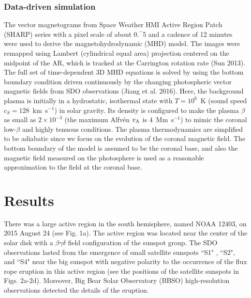 \documentclass[12pt,preprint]{aastex}
\begin{document}
\begin{CJK*}{UTF8}{gbsn}
\subsubsection{Data-driven simulation} 
The vector magnetograms from Space Weather HMI Active Region Patch (SHARP) series with a pixel scale of about 0.$^\prime$$^\prime$5 and a cadence of 12 minutes were used to derive the magnetohydrodynamic (MHD) model. The images were remapped using Lambert (cylindrical equal area) projection centered on the midpoint of the AR, which is tracked at the Carrington rotation rate (Sun 2013). The full set of time-dependent 3D MHD equations is solved by using the bottom boundary condition driven continuously by the changing photospheric vector magnetic fields from SDO observations (Jiang et al. 2016).  Here, the background plasma is initially in a hydrostatic, isothermal state with $T=10^{6}$~K (sound speed $c_{S}=128$~km~s$^{-1}$) in solar gravity. Its density is configured to make the plasma $\beta$ as small as $2\times 10^{-3}$ (the maximum Alfv{\'e}n $v_{\rm A}$ is $4$~Mm~s$^{-1}$) to mimic the coronal low-$\beta$ and highly tenuous conditions. The plasma thermodynamics are simplified to be adiabatic since we focus on the evolution of the coronal magnetic field. The bottom boundary of the model is assumed to be the coronal base, and also the magnetic field measured on the photosphere is used as a reasonable approximation to the field at the coronal base.

\section{Results}
There was a large active region in the south hemisphere, named NOAA 12403, on 2015 August 24 (see Fig. 1a). The active region was located  near the center of the solar disk with a $\beta$$\gamma$$\delta$ field configuration of the sunspot group. The SDO observations lasted from the emergence of small satellite sunspots ``S1" , ``S2", and ``S4" near the big sunspot with negative polarity to the occurrence of the flux rope eruption in this active region (see the positions of the satellite sunspots in Figs. 2a-2d). Moreover, Big Bear Solar Observatory (BBSO) high-resolution observations detected the details of the eruption. 


\end{CJK*}
\end{document}
